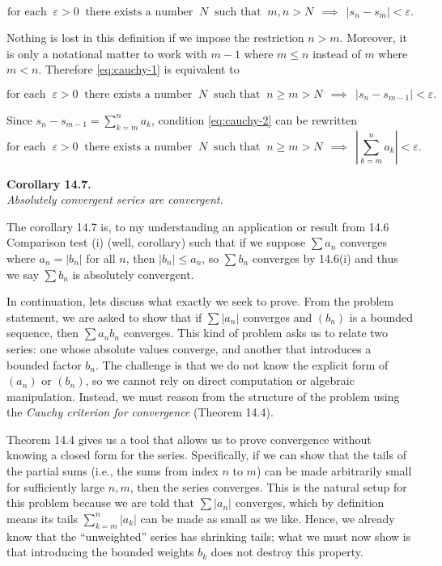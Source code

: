 \documentclass[12pt]{article}
\begin{document}
\begin{equation}\label{eq:cauchy-1}
\text{for each }\ \varepsilon>0\ \text{ there exists a number }\ N\ \text{ such that }\
m,n>N\ \ \implies\ \ |s_n-s_m|<\varepsilon .
\tag{1}
\end{equation}

Nothing is lost in this definition if we impose the restriction $n>m$.
Moreover, it is only a notational matter to work with $m-1$ where $m\le n$
instead of $m$ where $m<n$. Therefore \eqref{eq:cauchy-1} is equivalent to

\begin{equation}\label{eq:cauchy-2}
\text{for each }\ \varepsilon>0\ \text{ there exists a number }\ N\ \text{ such that }\
n\ge m > N\ \ \implies\ \ |s_n-s_{m-1}|<\varepsilon .
\tag{2}
\end{equation}

Since $s_n-s_{m-1}=\sum_{k=m}^{n} a_k$, condition \eqref{eq:cauchy-2} can be rewritten
\begin{equation}\label{eq:cauchy-3}
\text{for each }\ \varepsilon>0\ \text{ there exists a number }\ N\ \text{ such that }\
n\ge m > N\ \ \implies\ \ \left|\sum_{k=m}^{n} a_k\right|<\varepsilon .
\tag{3}
\end{equation}

\textbf{Corollary 14.7.}\\
\textit{Absolutely convergent series are convergent.}

The corollary 14.7 is, to my understanding an application or result from 14.6 Comparison test (i) (well, corollary) such that if we suppose $\sum a_n$ converges where $a_n = |b_n|$ for all $n$, then $|b_n| \leq a_n$, so $\sum b_n$ converges by 14.6(i) and thus we say $\sum b_n$ is absolutely convergent.

In continuation, lets discuss what exactly we seek to prove. From the problem statement, we are asked to show that if $\sum |a_n|$ converges and $(b_n)$ is a bounded sequence, then $\sum a_n b_n$ converges. This kind of problem asks us to relate two series: one whose absolute values converge, and another that introduces a bounded factor $b_n$. The challenge is that we do not know the explicit form of $(a_n)$ or $(b_n)$, so we cannot rely on direct computation or algebraic manipulation. Instead, we must reason from the structure of the problem using the \emph{Cauchy criterion for convergence} (Theorem 14.4).

Theorem 14.4 gives us a tool that allows us to prove convergence without knowing a closed form for the series. Specifically, if we can show that the tails of the partial sums (i.e., the sums from index $n$ to $m$) can be made arbitrarily small for sufficiently large $n,m$, then the series converges. This is the natural setup for this problem because we are told that $\sum |a_n|$ converges, which by definition means its tails $\sum_{k=m}^{n}|a_k|$ can be made as small as we like. Hence, we already know that the “unweighted” series has shrinking tails; what we must now show is that introducing the bounded weights $b_k$ does not destroy this property.
\end{document}
